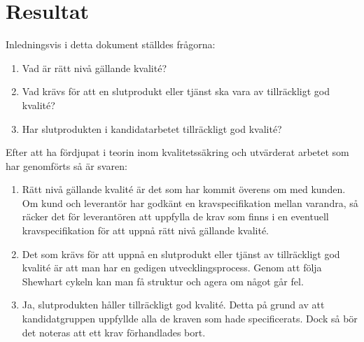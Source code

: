 \section{Resultat}
Inledningsvis i detta dokument ställdes frågorna:

\begin{enumerate}
  \item Vad är rätt nivå gällande kvalité?
  \item Vad krävs för att en slutprodukt eller tjänst ska vara av tillräckligt god kvalité?
  \item Har slutprodukten i kandidatarbetet tillräckligt god kvalité?
\end{enumerate}

\noindent Efter att ha fördjupat i teorin inom kvalitetssäkring och utvärderat arbetet som har genomförts så är svaren:

\begin{enumerate}
  \item Rätt nivå gällande kvalité är det som har kommit överens om med kunden. Om kund och leverantör har godkänt en kravspecifikation mellan varandra, så räcker det för leverantören att uppfylla de krav som finns i en eventuell kravspecifikation för att uppnå rätt nivå gällande kvalité.
  \item Det som krävs för att uppnå en slutprodukt eller tjänst av tillräckligt god kvalité är att man har en gedigen utvecklingsprocess. Genom att följa Shewhart cykeln kan man få struktur och agera om något går fel.  
  \item Ja, slutprodukten håller tillräckligt god kvalité. Detta på grund av att kandidatgruppen uppfyllde alla de kraven som hade specificerats. Dock så bör det noteras att ett krav förhandlades bort.
\end{enumerate}